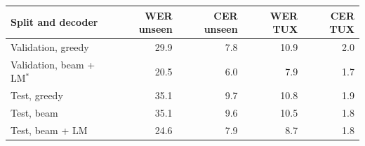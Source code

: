 \begin{tabular}{lrrrr}
\toprule
Split and decoder & WER unseen & CER unseen & WER TUX & CER TUX \\
\midrule
Validation, greedy & 29.9 & 7.8 & 10.9 & 2.0 \\
Validation, beam + LM$^{*}$ & 20.5 & 6.0 & 7.9 & 1.7 \\
\midrule Test, greedy & 35.1 & 9.7 & 10.8 & 1.9 \\
Test, beam & 35.1 & 9.6 & 10.5 & 1.8 \\
Test, beam + LM & 24.6 & 7.9 & 8.7 & 1.8 \\
\bottomrule
\end{tabular}

